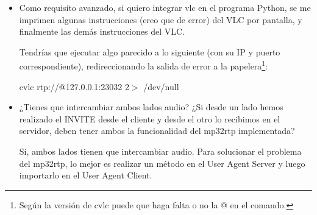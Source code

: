 \documentclass[a4paper,11pt]{article}
\begin{document}
\begin{itemize}
\item Como requisito avanzado, si quiero integrar vlc en el programa Python, se me imprimen algunas instrucciones (creo que de error) del VLC por pantalla, y finalmente las demás instrucciones del VLC.

Tendrías que ejecutar algo parecido a lo siguiente (con su IP y puerto correspondiente), redireccionando la salida de error a la papelera\footnote{Según la versión de cvlc puede que haga falta o no la @ en el comando.}:

cvlc rtp://@127.0.0.1:23032 2$>$ /dev/null

\item ¿Tienes que intercambiar ambos lados audio? ¿Si desde un lado hemos realizado el INVITE desde el cliente y desde el otro lo recibimos en el servidor, deben tener ambos la funcionalidad del mp32rtp implementada?

Sí, ambos lados tienen que intercambiar audio. Para solucionar el problema del mp32rtp, lo mejor es realizar un método en el User Agent Server y luego importarlo en el User Agent Client.

\end{itemize}

%
%
%
%
%
%
%



%
%
\end{document}
